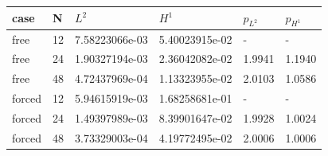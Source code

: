 \begin{center}\small
\begin{tabular}{llllll}
\toprule
case & N & $L^2$ & $H^1$ & $p_{L^2}$ & $p_{H^1}$\\
\midrule
free & 12 & 7.58223066e-03 & 5.40023915e-02 & - & -\\
free & 24 & 1.90327194e-03 & 2.36042082e-02 & 1.9941 & 1.1940\\
free & 48 & 4.72437969e-04 & 1.13323955e-02 & 2.0103 & 1.0586\\
forced & 12 & 5.94615919e-03 & 1.68258681e-01 & - & -\\
forced & 24 & 1.49397989e-03 & 8.39901647e-02 & 1.9928 & 1.0024\\
forced & 48 & 3.73329003e-04 & 4.19772495e-02 & 2.0006 & 1.0006\\
\bottomrule
\end{tabular}\end{center}
